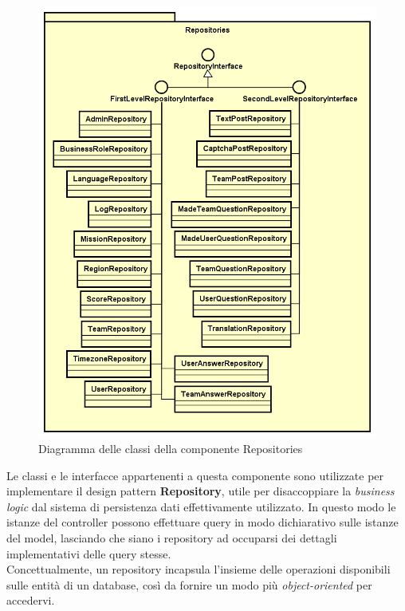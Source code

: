 \begin{figure}[H]
	\centering
  \includegraphics[scale=0.6]{immagini/components/repositories_diagram.png}
  \caption{Diagramma delle classi della componente Repositories}
	\label{fig:repositories} 
\end{figure}

Le classi e le interfacce appartenenti a questa componente sono utilizzate per implementare il design pattern \textbf{Repository}, utile per disaccoppiare la \textit{business logic} dal sistema di persistenza dati effettivamente utilizzato. In questo modo le istanze del controller possono effettuare query in modo dichiarativo sulle istanze del model, lasciando che siano i repository ad occuparsi dei dettagli implementativi delle query stesse. \\
Concettualmente, un repository incapsula l'insieme delle operazioni disponibili sulle entità di un database, così da fornire un modo più \textit{object-oriented} per accedervi.\\ \\

